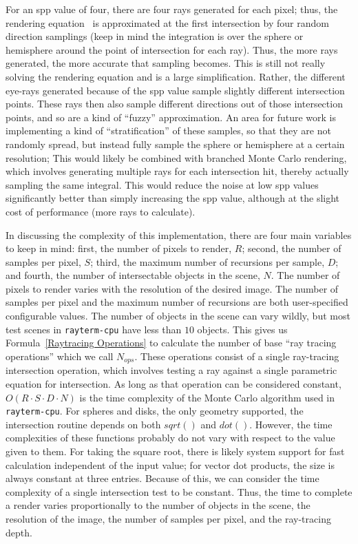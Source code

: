 For an spp value of four, there are four rays generated for each pixel; thus, the rendering equation~\cite{kajiya1986rendering} is approximated at the first intersection by four random direction samplings (keep in mind the integration is over the sphere or hemisphere around the point of intersection for each ray).
Thus, the more rays generated, the more accurate that sampling becomes.
This is still not really solving the rendering equation and is a large simplification.
Rather, the different eye-rays generated because of the spp value sample slightly different intersection points.
These rays then also sample different directions out of those intersection points, and so are a kind of ``fuzzy'' approximation.
An area for future work is implementing a kind of ``stratification'' of these samples, so that they are not randomly spread, but instead fully sample the sphere or hemisphere at a certain resolution;
This would likely be combined with branched Monte Carlo rendering, which involves generating multiple rays for each intersection hit, thereby actually sampling the same integral.
This would reduce the noise at low spp values significantly better than simply increasing the spp value, although at the slight cost of performance (more rays to calculate).


In discussing the complexity of this implementation, there are four main variables to keep in mind: first, the number of pixels to render, $R$; second, the number of samples per pixel, $S$; third, the maximum number of recursions per sample, $D$; and fourth, the number of intersectable objects in the scene, $N$.
The number of pixels to render varies with the resolution of the desired image.
The number of samples per pixel and the maximum number of recursions are both user-specified configurable values.
The number of objects in the scene can vary wildly, but most test scenes in \texttt{rayterm-cpu} have less than $10$ objects.
This gives us Formula~\ref{Raytracing Operations} to calculate the number of base ``ray tracing operations'' which we call $N_{ops}$.
These operations consist of a single ray-tracing intersection operation, which involves testing a ray against a single parametric equation for intersection.
As long as that operation can be considered constant, $O(R \cdot S \cdot D \cdot N)$ is the time complexity of the Monte Carlo algorithm used in \texttt{rayterm-cpu}.
For spheres and disks, the only geometry supported, the intersection routine depends on both $sqrt()$ and $dot()$.
However, the time complexities of these functions probably do not vary with respect to the value given to them.
For taking the square root, there is likely system support for fast calculation independent of the input value; for vector dot products, the size is always constant at three entries.
Because of this, we can consider the time complexity of a single intersection test to be constant.
Thus, the time to complete a render varies proportionally to the number of objects in the scene, the resolution of the image, the number of samples per pixel, and the ray-tracing depth.

